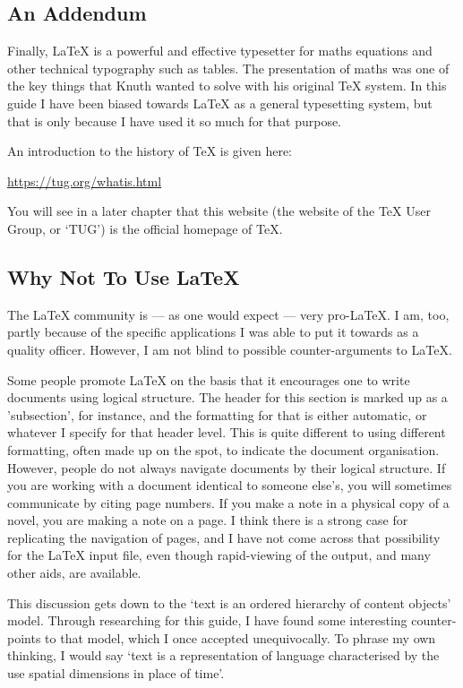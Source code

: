 \documentclass[11pt, oneside]{memoir}
\begin{document}
\subsection{An Addendum}
Finally, LaTeX is a powerful and effective typesetter for maths equations and other technical typography such as tables. The presentation of maths was one of the key things that Knuth wanted to solve with his original TeX system. In this guide I have been biased towards LaTeX as a general typesetting system, but that is only because I have used it so much for that purpose.

An introduction to the history of TeX is given here:

\url{https://tug.org/whatis.html}

You will see in a later chapter that this website (the website of the TeX User Group, or `TUG') is the official homepage of TeX.

\subsection{Why Not To Use LaTeX}
The LaTeX community is — as one would expect — very pro-LaTeX. I am, too, partly because of the specific applications I was able to put it towards as a quality officer. However, I am not blind to possible counter-arguments to LaTeX.

Some people promote LaTeX on the basis that it encourages one to write documents using logical structure. The header for this section is marked up as a 'subsection', for instance, and the formatting for that is either automatic, or whatever I specify for that header level. This is quite different to using different formatting, often made up on the spot, to indicate the document organisation. However, people do not always navigate documents by their logical structure. If you are working with a document identical to someone else's, you will sometimes communicate by citing page numbers. If you make a note in a physical copy of a novel, you are making a note on a page. I think there is a strong case for replicating the navigation of pages, and I have not come across that possibility for the LaTeX input file, even though rapid-viewing of the output, and many other aids, are available.

This discussion gets down to the `text is an ordered hierarchy of content objects' model. Through researching for this guide, I have found some interesting counter-points to that model, which I once accepted unequivocally. To phrase my own thinking, I would say `text is a representation of language characterised by the use spatial dimensions in place of time'.
\end{document}
